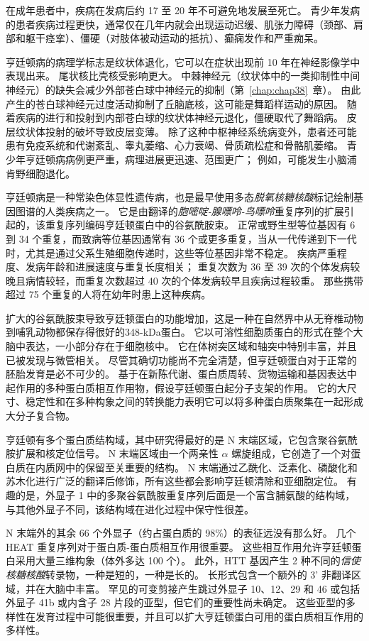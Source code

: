 在成年患者中，疾病在发病后约 17 至 20 年不可避免地发展至死亡。
青少年发病的患者疾病过程更快，通常仅在几年内就会出现运动迟缓、肌张力障碍（颈部、肩部和躯干痉挛）、僵硬（对肢体被动运动的抵抗）、癫痫发作和严重痴呆。


亨廷顿病的病理学标志是纹状体退化，它可以在症状出现前 10 年在神经影像学中表现出来。
尾状核比壳核受影响更大。
中棘神经元（纹状体中的一类抑制性中间神经元）的缺失会减少外部苍白球中神经元的抑制（第~\ref{chap:chap38}~章）。
由此产生的苍白球神经元过度活动抑制了丘脑底核，这可能是舞蹈样运动的原因。
随着疾病的进行和投射到内部苍白球的纹状体神经元退化，僵硬取代了舞蹈病。
皮层纹状体投射的破坏导致皮层变薄。
除了这种中枢神经系统病变外，患者还可能患有免疫系统和代谢紊乱、睾丸萎缩、心力衰竭、骨质疏松症和骨骼肌萎缩。
青少年亨廷顿病病例更严重，病理进展更迅速、范围更广；
例如，可能发生小脑浦肯野细胞退化。


亨廷顿病是一种常染色体显性遗传病，也是最早使用多态\textit{脱氧核糖核酸}标记绘制基因图谱的人类疾病之一。
它是由翻译的\textit{胞嘧啶-腺嘌呤-鸟嘌呤}重复序列的扩展引起的，该重复序列编码亨廷顿蛋白中的谷氨酰胺束。
正常或野生型等位基因有 6 到 34 个重复，而致病等位基因通常有 36 个或更多重复，当从一代传递到下一代时，尤其是通过父系生殖细胞传递时，这些等位基因非常不稳定。
疾病严重程度、发病年龄和进展速度与重复长度相关；
重复次数为 36 至 39 次的个体发病较晚且病情较轻，而重复次数超过 40 次的个体发病较早且疾病过程较重。
那些携带超过 75 个重复的人将在幼年时患上这种疾病。


扩大的谷氨酰胺束导致亨廷顿蛋白的功能增加，这是一种在自然界中从无脊椎动物到哺乳动物都保存得很好的348-kDa蛋白。
它以可溶性细胞质蛋白的形式在整个大脑中表达，一小部分存在于细胞核中。
它在体树突区域和轴突中特别丰富，并且已被发现与微管相关。
尽管其确切功能尚不完全清楚，但亨廷顿蛋白对于正常的胚胎发育是必不可少的。
基于在新陈代谢、蛋白质周转、货物运输和基因表达中起作用的多种蛋白质相互作用物，假设亨廷顿蛋白起分子支架的作用。
它的大尺寸、稳定性和在多种构象之间的转换能力表明它可以将多种蛋白质聚集在一起形成大分子复合物。


亨廷顿有多个蛋白质结构域，其中研究得最好的是 N 末端区域，它包含聚谷氨酰胺扩展和核定位信号。
N 末端区域由一个两亲性 $\alpha$ 螺旋组成，它创造了一个对蛋白质在内质网中的保留至关重要的结构。
N 末端通过乙酰化、泛素化、磷酸化和苏木化进行广泛的翻译后修饰，所有这些都会影响亨廷顿清除和亚细胞定位。
有趣的是，外显子 1 中的多聚谷氨酰胺重复序列后面是一个富含脯氨酸的结构域，与其他外显子不同，该结构域在进化过程中保守性很差。


N 末端外的其余 66 个外显子（约占蛋白质的 98\%）的表征远没有那么好。
几个 HEAT 重复序列对于蛋白质-蛋白质相互作用很重要。
这些相互作用允许亨廷顿蛋白采用大量三维构象（体外多达 100 个）。
此外，HTT 基因产生 2 种不同的\textit{信使核糖核酸}转录物，一种是短的，一种是长的。
长形式包含一个额外的 3' 非翻译区域，并在大脑中丰富。
罕见的可变剪接产生跳过外显子 10、12、29 和 46 或包括外显子 41b 或内含子 28 片段的亚型，但它们的重要性尚未确定。
这些亚型的多样性在发育过程中可能很重要，并且可以扩大亨廷顿蛋白可用的蛋白质相互作用的多样性。




